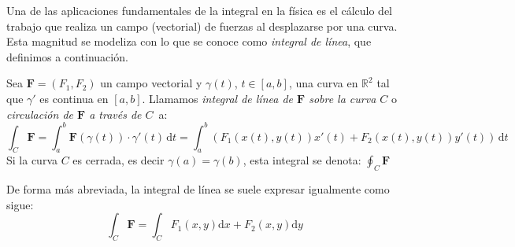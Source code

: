 Una de las aplicaciones fundamentales de la integral en la física es el cálculo del trabajo que realiza un campo (vectorial) de fuerzas al desplazarse por una curva. 
Esta magnitud se modeliza con lo que se conoce como \emph{integral de línea}, que definimos a continuación.
%
\begin{definicion}
Sea $\boldsymbol{F}=(F_1,F_2)$ un campo vectorial y $\gamma(t)$, $t\in[a,b]$, una curva en $\mathbb{R}^2$ tal que $\gamma'$ es continua en $[a,b]$.
Llamamos \emph{integral de línea de $\boldsymbol{F}$ sobre la curva $C$} o \emph{circulación de $\boldsymbol{F}$ a través de $C$}~a:
\[
\int_C \boldsymbol{F} = 
\int_a^b \boldsymbol{F}(\gamma(t))\cdot\gamma'(t)\,\mathrm dt
= \int_a^b (F_1(x(t),y(t))x'(t)+F_2(x(t),y(t))y'(t))\,\mathrm dt
\]
Si la curva $C$ es cerrada, es decir $\gamma(a)=\gamma(b)$, esta integral se denota:
$\displaystyle\oint_C \boldsymbol{F}$
\end{definicion}
De forma más abreviada, la integral de línea se suele expresar igualmente como sigue:
\[
\int_C \boldsymbol{F} = \int_C F_1(x,y)\mathrm dx+F_2(x,y)\mathrm dy
\]

